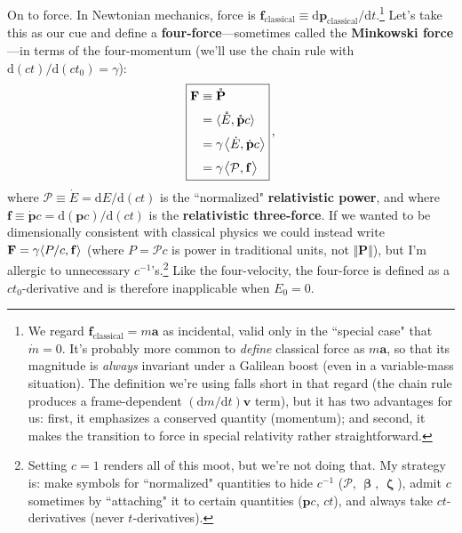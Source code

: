 \documentclass[12pt]{article}
\renewcommand{\vv}[1]{\mathbf{#1}}
\newcommand{\dd}[1]{\mathrm{d}#1}
\newcommand{\vvbeta}{\bm{\upbeta}}
\newcommand{\vvzeta}{\bm{\upzeta}}
\begin{document}
On to force. In Newtonian mechanics, force is $\vv f_{\mathrm{classical}} \equiv \dd \vv p_{\mathrm{classical}} / \dd t$.\footnote{\label{fn:cf}We regard $\vv f_{\mathrm{classical}} = m \vv a$ as incidental, valid only in the ``special case" that $\dot{m} = 0$. It's probably more common to \emph{define} classical force as $m \vv a$, so that its magnitude is \emph{always} invariant under a Galilean boost (even in a variable-mass situation). The definition we're using falls short in that regard (the chain rule produces a frame-dependent $(\dd m / \dd t) \vv v$ term), but it has two advantages for us: first, it emphasizes a conserved quantity (momentum); and second, it makes the transition to force in special relativity rather straightforward.} Let's take this as our cue and define a \textbf{four-force}---sometimes called the \textbf{Minkowski force}---in terms of the four-momentum (we'll use the chain rule with $\dd (ct) / \dd (c t_0) = \gamma$):
\begin{equation}\label{eq:33}
\boxed{
\begin{aligned}
\vv F &\equiv \mathring{\vv P} \\[2pt]
&= \langle \mathring{E}, \mkern.5mu \mathring{\vv p} c \rangle \\[3pt]
&= \gamma \mkern1.5mu \big \langle \dot{E}, \mkern.5mu \dot{\vv p} c \big \rangle \\[3pt]
&=\gamma \mkern1.5mu \big \langle \mathcal{P}, \mkern.5mu \vv f \big \rangle
\end{aligned}
} \, ,
\end{equation}
where $\mathcal{P} \equiv \dot{E} = \dd E / \dd (ct)$ is the ``normalized" \textbf{relativistic power}, and where ${\vv f \equiv \dot{\vv p} c = \dd (\vv p c) / \dd (ct)}$ is the \textbf{relativistic three-force}. If we wanted to be dimensionally consistent with classical physics we could instead write ${\vv F = \gamma \langle P/c, \mkern.5mu \vv f \rangle}$ (where $P = \mathcal{P}c$ is power in traditional units, not $\Vert \vv P \Vert$), but I'm allergic to unnecessary $c^{-1}$'s.\footnote{Setting $c = 1$ renders all of this moot, but we're not doing that. My strategy is: make symbols for ``normalized" quantities to hide $c^{-1}$ ($\mathcal P$, $\vvbeta$, $\vvzeta$), admit $c$ sometimes by ``attaching" it to certain quantities ($\vv p c$, $ct$), and always take $ct$-derivatives (never $t$-derivatives).} Like the four-velocity, the four-force is defined as a $ct_0$-derivative and is therefore inapplicable when $E_0 = 0$.
\end{document}
